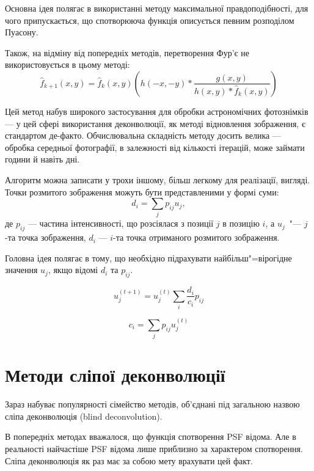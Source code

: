 \documentclass{diploma}
\begin{document}
      Основна ідея полягає в використанні методу максимальної
      правдоподібності, для чого припускається, що спотворююча функція
      описується певним розподілом Пуасону.

      Також, на відміну від попередніх методів, перетворення Фур’є не
      використовується в цьому методі:
      \begin{equation}
        \hat{f}_{k+1}\left( x, y \right) = \hat{f}_k \left( x, y \right)\left(
        h\left( -x, -y \right) \ast \frac{g\left( x, y \right)}{h\left( x, y
          \right) \ast \hat{f}_k\left( x, y \right)} \right)
        \label{eq:lr1}
      \end{equation}

      Цей метод набув широкого застосування для обробки астрономічних
      фотознімків --- у цей сфері використання деконволюції, як методі
      відновлення зображення, є стандартом де-факто.
      Обчислювальна складність методу досить велика --- обробка середньої
      фотографії, в залежності від кількості ітерацій, може займати години й
      навіть дні.

      Алгоритм можна записати у трохи іншому, більш легкому для реалізації,
      вигляді.
      Точки розмитого зображення можуть бути представленими у формі суми:
      \[ d_i = \sum_j p_{ij} u_j, \]
      де $p_{ij}$ --- частина інтенсивності, що розсіялася з позиції $j$ в
      позицію $i$, а $u_j$~"--- $j$-та точка зображення, $d_i$ --- $i$-та точка
      отриманого розмитого зображення.\cite{richardson-hadley}

      Головна ідея полягає в тому, що необхідно підрахувати найбільш"=вірогідне
      значення $u_j$, якщо відомі $d_i$ та $p_{ij}$.

      \begin{equation}
        u_j^{(t+1)} = u_j^{(t)} \sum_i \frac{d_i}{c_i} p_{ij}
        \label{eq:rl-deconv}
      \end{equation}

      \[c_i = \sum_j p_{ij} u_j^{(t)}\]
      \clearpage
  \section{Методи сліпої деконволюції}
    Зараз набуває популярності сімейство методів, об’єднані під загальною
    назвою сліпа деконволюція (blind deconvolution).

    В попередніх методах вважалося, що функція спотворення PSF відома.
    Але в реальності найчастіше PSF відома лише приблизно за характером
    спотворення.
    Сліпа деконволюція як раз має за собою мету врахувати цей факт.
\end{document}
